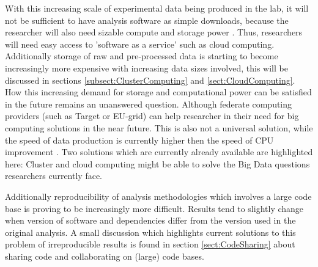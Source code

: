 With this increasing scale of experimental data being produced in the lab, it will not be 
sufficient to have analysis software as simple downloads, because the researcher will 
also need sizable compute and storage power \cite{Schadt:2010}. Thus, researchers will 
need easy access to 'software as a service' such as cloud computing. Additionally storage 
of raw and pre-processed data is starting to become increasingly more expensive with 
increasing data sizes involved, this will be discussed in sections \ref{subsect:ClusterComputing} 
and \ref{sect:CloudComputing}. 
How this increasing demand for storage and computational power can be satisfied in the future remains 
an unanswered question. Although federate computing providers (such as Target or EU-grid) can help 
researcher in their need for big computing solutions in the near future. This is also not a 
universal solution, while the speed of data production is currently higher then the speed of 
CPU improvement \cite{Moore:1998, Editorial:2009, Shah:2013}. Two solutions which are 
currently already available are highlighted here: Cluster and cloud computing might be able to 
solve the Big Data questions researchers currently face.

Additionally reproducibility of analysis methodologies which involves a large code base is proving 
to be increasingly more difficult. Results tend to slightly change when version of software and 
dependencies differ from the version used in the original analysis. A small discussion which highlights 
current solutions to this problem of irreproducible results is found in section \ref{sect:CodeSharing} 
about sharing code and collaborating on (large) code bases.

